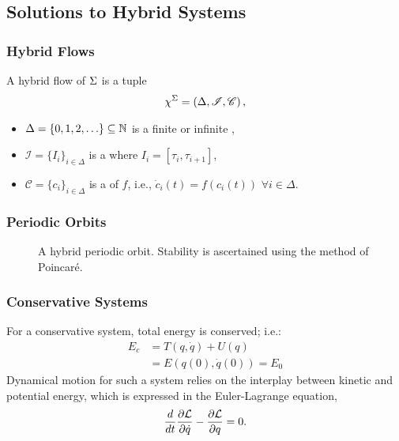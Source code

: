 \subsection{Solutions to Hybrid Systems}
\begin{frame}[t]
  \frametitle{Hybrid Flows}
  A \alert{hybrid flow} of $\Sigma$ is a tuple
  \begin{align*}
    \chi^{\Sigma} = \left( \Delta, \mathscr{I}, \mathscr{C} \right),
  \end{align*}
  \vspace{-2em}
  \begin{itemize}
  \item $\Delta = \{0, 1, 2, \ldots\} \subseteq \mathbb{N}$ is a finite or infinite ,
  \item $\mathscr{I} = \{I_{i} \}_{i \in \Delta}$ is a  where $I_{i} = [\tau_{i}, \tau_{i + 1}]$,
  \item $\mathscr{C} = \{c_{i} \}_{i \in \Delta}$ is a  of $f$, i.e., ${\dot c}_{i}(t) = f(c_{i}(t))$ $\forall i \in \Delta$.
  \end{itemize}


\end{frame}


\begin{frame}[t]
  \frametitle{Periodic Orbits}
  \begin{figure}    
    \centering
    \def\svgwidth{.45\columnwidth}
    
    \caption{A hybrid periodic orbit. Stability is ascertained using the method of Poincar\'e.}
  \end{figure}
\end{frame}

\begin{frame}[t]
  \frametitle{Conservative Systems}
  For a conservative system, total energy is conserved; i.e.:
  \begin{align*}
    E_{c} &= T(q, \dot q) + U(q)\\
    &= E(q(0), \dot q(0)) = E_{0}
  \end{align*}
  Dynamical motion for such a system relies on the interplay between kinetic and potential energy, which is expressed in the Euler-Lagrange equation,
  \begin{align*}
    \frac{d}{dt} \frac{\partial{\ensuremath{\mathcal{L}}}}{\partial{\ensuremath{\dot q}}} - \frac{\partial{\ensuremath{\mathcal{L}}}}{\partial{\ensuremath{q}}} = 0.
  \end{align*}
\end{frame}


